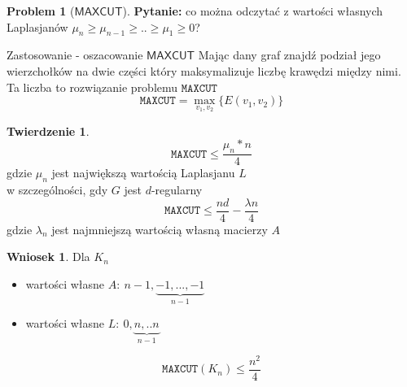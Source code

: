 \documentclass[a4paper,12pt]{article}
\theoremstyle{definition}%
\newtheorem{remark}{Wniosek}%
\newtheorem{theorem}{Twierdzenie}%
\theoremstyle{definition}
\theoremstyle{problem}
\newtheorem*{problem*}{Problem}
\begin{document}
\begin{problem*}[$\mathsf{MAX CUT}$]
\textbf{Pytanie: } co można odczytać z wartości własnych Laplasjanów $\mu _n \geq \mu _{n-1}\geq ..\geq \mu _1 \geq 0$?

Zastosowanie - oszacowanie $\mathsf{MAX CUT}$ \newline
Mając dany graf znajdź podział jego wierzchołków na dwie części który maksymalizuje liczbę krawędzi między nimi.\\ Ta liczba to rozwiązanie problemu $\mathtt{MAX CUT}$
$$\mathtt{MAX CUT}=\max _{v_1, v_2}\{E(v_1,v_2)\}$$
\end{problem*}
\begin{theorem}
$$\mathtt{MAX CUT}\leq \frac{\mu _n*n}{4}$$ gdzie $\mu _n$ jest największą wartością Laplasjanu $L$\\
w szczególności, gdy $G$ jest $d$-regularny
$$ \mathtt{MAX CUT}\leq \frac{nd}{4}-\frac{\lambda n}{4}$$ gdzie $\lambda _n$ jest najmniejszą wartością własną macierzy $A$
\end{theorem}

\begin{remark}
Dla $K_n$
\begin{itemize}[label=$\rightarrow$]
\item wartości własne $A:\ n-1, \underbrace{-1,...,-1}_{n-1}$
\item wartości własne $L:\ 0, \underbrace{n,..n}_{n-1}$
\end{itemize}
$$\mathtt{MAX CUT}(K_n)\leq \frac{n^2}{4}$$
\end{remark}
\end{document}
